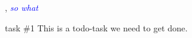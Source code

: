 \documentclass[BSP,english,oneside]{classes/gucthesis}
\newcommand{\comment}[1]{\textcolor{blue}{\emph{#1}}}
\newcommand{\todo}[1]{{\color{green}#1}}
\begin{document}


\makefrontpages



\tableofcontents
\listoffigures
\listoftables












\appendix %



\GUC, 
\comment{so what}

\todo{task \#1}
This is a todo-task we need to get done.
\end{document}
